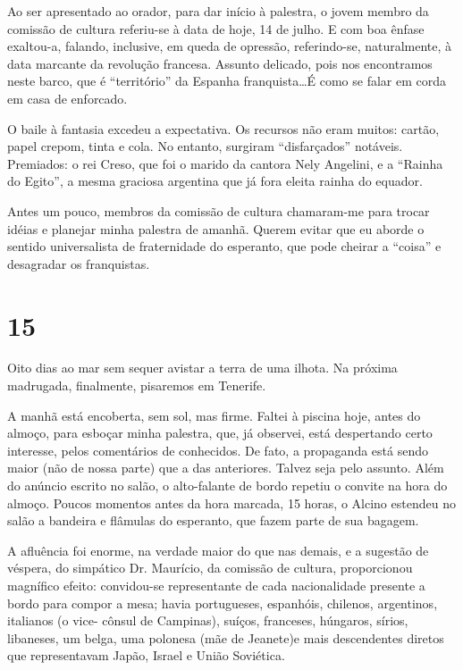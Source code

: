 Ao ser apresentado ao orador, para dar início à palestra, o jovem membro da comissão de cultura referiu-se à data de hoje, 14 de julho. E com boa ênfase exaltou-a, falando, inclusive, em queda de opressão, referindo-se, naturalmente, à data marcante da revolução francesa. Assunto delicado, pois nos encontramos neste barco, que é “território” da Espanha franquista\ldots É como se falar em corda em casa de enforcado.

O baile à fantasia excedeu a expectativa. Os recursos não eram muitos: cartão, papel crepom, tinta e cola. No entanto, surgiram “disfarçados” notáveis. Premiados: o rei Creso, que foi o marido da cantora Nely Angelini, e a “Rainha do Egito”, a mesma graciosa argentina que já fora eleita rainha do equador.

Antes um pouco, membros da comissão de cultura chamaram-me para trocar idéias e planejar minha palestra de amanhã. Querem evitar que eu aborde o sentido universalista de fraternidade do esperanto, que pode cheirar a “coisa” e desagradar os franquistas.

\section*{15 \adfflatleafright {}}

Oito dias ao mar sem sequer avistar a terra de uma ilhota. Na próxima madrugada, finalmente, pisaremos em Tenerife.

A manhã está encoberta, sem sol, mas firme. Faltei à piscina hoje, antes do almoço, para esboçar minha palestra, que, já observei, está despertando certo interesse, pelos comentários de conhecidos. De fato, a propaganda está sendo maior (não de nossa parte) que a das anteriores. Talvez seja pelo assunto. Além do anúncio escrito no salão, o alto-falante de bordo repetiu o convite na hora do almoço. Poucos momentos antes da hora marcada, 15 horas, o Alcino estendeu no salão a bandeira e flâmulas do esperanto, que fazem parte de sua bagagem.

A afluência foi enorme, na verdade maior do que nas demais, e a sugestão de véspera, do simpático Dr. Maurício, da comissão de cultura, proporcionou magnífico efeito: convidou-se representante de cada nacionalidade presente a bordo para compor a mesa; havia portugueses, espanhóis, chilenos, argentinos, italianos (o vice- cônsul de Campinas), suíços, franceses, húngaros, sírios, libaneses, um belga, uma polonesa (mãe de Jeanete)e mais descendentes diretos que representavam Japão, Israel e União Soviética.

